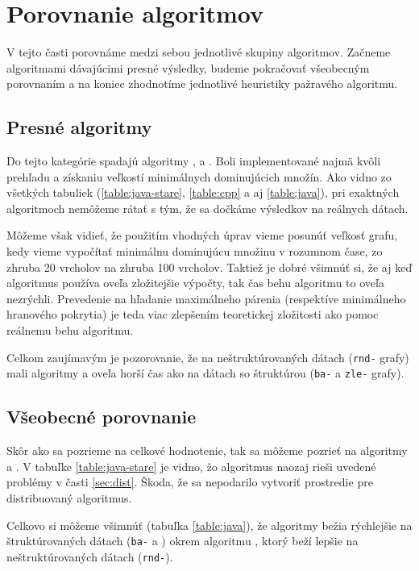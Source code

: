 \section{Porovnanie algoritmov}

V tejto časti porovnáme medzi sebou jednotlivé skupiny algoritmov. Začneme 
algoritmami dávajúcimi presné výsledky, budeme pokračovať všeobecným porovnaním 
a na koniec zhodnotíme jednotlivé heuristiky pažravého algoritmu.

\subsection{Presné algoritmy}

Do tejto kategórie spadajú algoritmy ,  a . 
Boli implementované najmä kvôli prehľadu a získaniu veľkostí minimálnych 
dominujúcich množín. Ako vidno zo všetkých tabuliek (\ref{table:java-stare}, 
\ref{table:cpp} a aj \ref{table:java}), pri exaktných algoritmoch nemôžeme 
rátať s tým, že sa dočkáme výsledkov na reálnych dátach.

Môžeme však vidieť, že použitím vhodných úprav vieme posunúť veľkosť grafu, 
kedy vieme vypočítať minimálnu dominujúcu množinu v rozumnom čase, zo zhruba 
20 vrcholov na zhruba 100 vrcholov. Taktiež je dobré všimnúť si, že aj keď 
algoritmus  používa oveľa zložitejšie výpočty, tak čas behu 
algoritmu to oveľa nezrýchli. Prevedenie na hľadanie maximálneho párenia 
(respektíve minimálneho hranového pokrytia) je teda viac zlepšením teoretickej 
zložitosti ako pomoc reálnemu behu algoritmu.

Celkom zaujímavým je pozorovanie, že na neštruktúrovaných dátach (\texttt{rnd-} 
grafy) mali algoritmy  a  oveľa horší čas ako na 
dátach so štruktúrou (\texttt{ba-} a \texttt{zle-} grafy).

\subsection{Všeobecné porovnanie}

Skôr ako sa pozrieme na celkové hodnotenie, tak sa môžeme pozrieť na algoritmy 
 a . V tabuľke \ref{table:java-stare} je vidno, 
žo algoritmus  naozaj rieši uvedené problémy v časti 
\ref{sec:dist}. Škoda, že sa nepodarilo vytvoriť prostredie pre distribuovaný 
algoritmus.

Celkovo si môžeme všimnúť (tabuľka \ref{table:java}), že algoritmy bežia 
rýchlejšie na štruktúrovaných dátach (\texttt{ba-} a ) okrem 
algoritmu , ktorý beží lepšie na neštruktúrovaných dátach 
(\texttt{rnd-}). 

